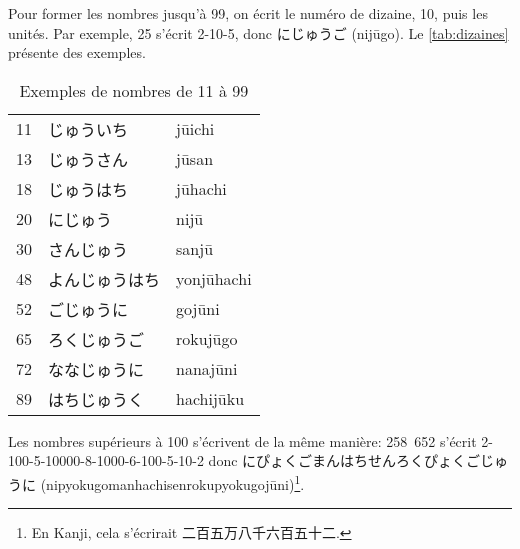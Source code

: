 \documentclass[a4paper,10pt,french,openany]{memoir}
\begin{document}
Pour former les nombres jusqu'à 99, on écrit le numéro de dizaine, 10, puis les unités. Par exemple, 25 s'écrit 2-10-5, donc にじゅうご (nijūgo). Le \autoref{tab:dizaines} présente des exemples.

\begin{table}[htbp]
 \centering
 \begin{tabular}{cll}
  11 & じゅういち    &jūichi\\
  13 & じゅうさん    &jūsan\\
  18 & じゅうはち    &jūhachi\\
  20 & にじゅう      &nijū\\
  30 & さんじゅう    &sanjū\\
  48 & よんじゅうはち &yonjūhachi\\
  52 & ごじゅうに    &gojūni\\
  65 & ろくじゅうご  &rokujūgo\\
  72 & ななじゅうに  &nanajūni\\
  89 & はちじゅうく  &hachijūku\\
 \end{tabular}
 \caption{Exemples de nombres de 11 à 99}
 \label{tab:dizaines}
\end{table}

Les nombres supérieurs à 100 s'écrivent de la même manière: 258~652 s'écrit 2-100-5-10000-8-1000-6-100-5-10-2 donc にぴょくごまんはちせんろくぴょくごじゅうに (nipyokugomanhachisenrokupyokugojūni)\footnote{En Kanji, cela s'écrirait 二百五万八千六百五十二.}.
\end{document}

